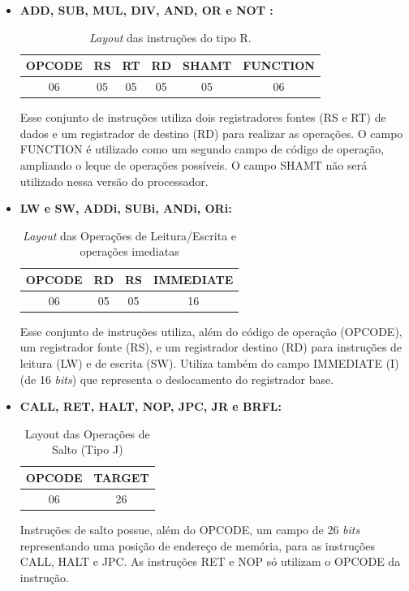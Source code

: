 \documentclass{report}
\begin{document}
  \begin{itemize}
     
     \item \textbf{ADD, SUB, MUL, DIV, AND, OR e NOT :}

  \begin{table}[H]
\centering
	\begin{tabular}{|c|c|c|c|c|c|}
  	\hline 
  	\textbf{OPCODE} & \textbf{RS} & \textbf{RT} & \textbf{RD} & \textbf{SHAMT} & \textbf{FUNCTION} \\ 
  	\hline 
  	06 & 05 & 05 & 05 & 05 & 06 \\ 
  	\hline 
  	\end{tabular} 
  	\caption{\textit{Layout} das instruções do tipo R.}
  \end{table}
  
  Esse conjunto de instruções utiliza dois registradores fontes (RS e RT) de dados e um registrador de destino (RD) para realizar as operações. O campo FUNCTION é utilizado como um segundo campo de código de operação, ampliando o leque de operações possíveis. O campo SHAMT não será utilizado nessa versão do processador.\\
  
   \item \textbf{LW e SW, ADDi, SUBi, ANDi, ORi:}

  \begin{table}[H]
\centering
	\begin{tabular}{|c|c|c|c|}
  	\hline 
  	\textbf{OPCODE} & \textbf{RD} & \textbf{RS} & \textbf{IMMEDIATE}  \\ 
  	\hline 
  	06 & 05 & 05 & 16 \\ 
  	\hline 
  	\end{tabular} 
  	\caption{\textit{Layout} das Operações de Leitura/Escrita e operações imediatas}
  \end{table}
  
  Esse conjunto de instruções utiliza, além do código de operação (OPCODE), um registrador fonte (RS), e um registrador destino (RD) para instruções de leitura (LW) e de escrita (SW). Utiliza também do campo IMMEDIATE (I) (de 16 \textit{bits}) que representa o deslocamento do registrador base.\\

  
  \item \textbf{CALL, RET, HALT, NOP, JPC, JR e BRFL:}

  \begin{table}[H]
\centering
	\begin{tabular}{|c|c|}
  	\hline 
  	\textbf{OPCODE} & \textbf{TARGET} \\ 
  	\hline 
  	06 & 26 \\ 
  	\hline 
  	\end{tabular} 
  	\caption{Layout das Operações de Salto (Tipo J)}
  \end{table}
  
  Instruções de salto possue, além do OPCODE, um campo de 26 \textit{bits} representando uma posição de endereço de memória, para as instruções CALL, HALT e JPC. As instruções RET e NOP só utilizam o OPCODE da instrução.\\
  
  \end{itemize}
\end{document}
